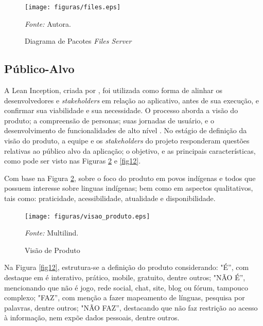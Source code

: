 \begin{figure}[h!]
	\centering
	\caption{Diagrama de Pacotes \textit{Files Server}}
	\begin{adjustbox}{center}
		\texttt{[image: figuras/files.eps]}
	\end{adjustbox}
	\begin{tablenotes}[flushleft]
		\centering
		\item \textit{Fonte:} Autora.
	\end{tablenotes}
	\label{fig10}
\end{figure}

\subsection{Público-Alvo}
\label{Publico-Alvo}
A Lean Inception, criada por , foi utilizada como forma de alinhar os desenvolvedores e \textit{stakeholders} em relação ao aplicativo, antes de sua execução, e confirmar sua viabilidade e sua necessidade. O processo aborda a visão do produto; a compreensão de personas; suas jornadas de usuário, e 
o desenvolvimento de funcionalidades de alto nível \cite{lean}. No estágio de definição da visão do produto, a equipe e os \textit{stakeholders} do projeto responderam questões relativas ao público alvo da aplicação; o objetivo, e as principais características, como pode ser visto nas 
Figuras \ref{fig11} e \ref{fig12}. 

Com base na Figura \ref{fig11}, sobre o foco do produto em povos indígenas e todos que possuem interesse sobre linguas indígenas; bem como em aspectos qualitativos, tais como: praticidade, acessibilidade, atualidade 
e disponibilidade. 

\begin{figure}[h!]
	\centering
	\caption{Visão de Produto}
	\begin{adjustbox}{center}
		\texttt{[image: figuras/visao\_produto.eps]}
	\end{adjustbox}
	\begin{tablenotes}[flushleft]
		\centering
		\item \textit{Fonte:} Multilind.
	\end{tablenotes}
	\label{fig11}
\end{figure}
Na Figura \ref{fig12}, estrutura-se a definição do produto considerando: "É'', com destaque em é interativo, prático, mobile, gratuito, dentre outros; "NÃO É'', mencionando que não é jogo, rede social, chat, site, blog ou fórum, tampouco complexo; "FAZ'', com menção a fazer mapeamento de línguas, 
pesquisa por palavras, dentre outros; "NÃO FAZ'', destacando que não faz restrição ao acesso à informação, nem expõe dados pessoais, dentre outros.

